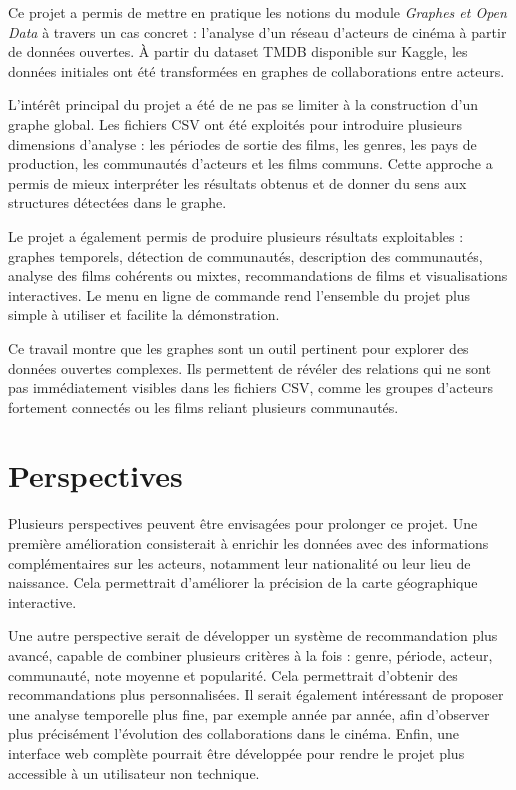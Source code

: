\documentclass[11pt,a4paper,oneside,openany]{report}
\begin{document}
Ce projet a permis de mettre en pratique les notions du module \textit{Graphes et Open Data} à travers un cas concret : l’analyse d’un réseau d’acteurs de cinéma à partir de données ouvertes. À partir du dataset TMDB disponible sur Kaggle, les données initiales ont été transformées en graphes de collaborations entre acteurs.

L’intérêt principal du projet a été de ne pas se limiter à la construction d’un graphe global. Les fichiers CSV ont été exploités pour introduire plusieurs dimensions d’analyse : les périodes de sortie des films, les genres, les pays de production, les communautés d’acteurs et les films communs. Cette approche a permis de mieux interpréter les résultats obtenus et de donner du sens aux structures détectées dans le graphe.

Le projet a également permis de produire plusieurs résultats exploitables : graphes temporels, détection de communautés, description des communautés, analyse des films cohérents ou mixtes, recommandations de films et visualisations interactives. Le menu en ligne de commande rend l’ensemble du projet plus simple à utiliser et facilite la démonstration.

Ce travail montre que les graphes sont un outil pertinent pour explorer des données ouvertes complexes. Ils permettent de révéler des relations qui ne sont pas immédiatement visibles dans les fichiers CSV, comme les groupes d’acteurs fortement connectés ou les films reliant plusieurs communautés.

\section{Perspectives}

Plusieurs perspectives peuvent être envisagées pour prolonger ce projet. Une première amélioration consisterait à enrichir les données avec des informations complémentaires sur les acteurs, notamment leur nationalité ou leur lieu de naissance. Cela permettrait d’améliorer la précision de la carte géographique interactive.

Une autre perspective serait de développer un système de recommandation plus avancé, capable de combiner plusieurs critères à la fois : genre, période, acteur, communauté, note moyenne et popularité. Cela permettrait d’obtenir des recommandations plus personnalisées. Il serait également intéressant de proposer une analyse temporelle plus fine, par exemple année par année, afin d’observer plus précisément l’évolution des collaborations dans le cinéma. Enfin, une interface web complète pourrait être développée pour rendre le projet plus accessible à un utilisateur non technique.
\end{document}
